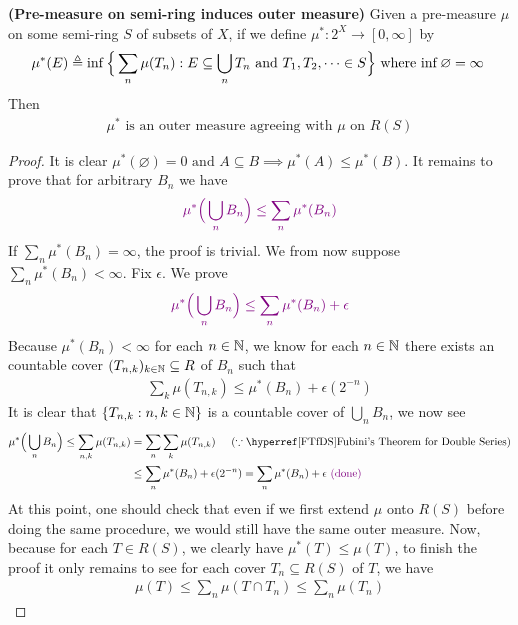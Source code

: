 \documentclass{report}
\begin{document}
\begin{theorem}
\label{Piom}
\textbf{(Pre-measure on semi-ring induces outer measure)} Given a pre-measure $\mu$ on some semi-ring $S$ of subsets of $X$, if we define $\mu^*:2^X\rightarrow [0,\infty]$ by
\begin{align*}
\mu^*(E)\triangleq \inf \Big\{ \sum_n \mu (T_n):E \subseteq \bigcup _n T_n\text{ and }T_1,T_2,\dots \in S \Big\}\text{ where $\inf \varnothing= \infty$ }
\end{align*}
Then 
\begin{align*}
  \mu^*\text{ is an outer measure agreeing with $\mu$ on $R(S)$}
\end{align*}
\end{theorem}
\begin{proof}
  It is clear $\mu^*(\varnothing)=0\text{ and }A\subseteq B \implies \mu^*(A)\leq \mu^*(B)$. It remains to prove that for arbitrary $B_n$ we have 
\begin{align*}
  \textcolor{violet}{\mu^* \Big(\bigcup_n B_n \Big)  \leq \sum_n \mu^* (B_n)}
\end{align*}
If  $\sum_n \mu^*(B_n)=\infty$, the proof is trivial. We from now suppose $\sum_n \mu^*(B_n)< \infty$. Fix $\epsilon $. We prove 
\begin{align*}
  \textcolor{violet}{\mu^*\Big(\bigcup _n B_n \Big)\leq \sum_n \mu^* (B_n)+\epsilon }
\end{align*}
Because $\mu^*(B_n)<\infty$ for each $n\in\mathbb{N}$, we know for each $n\in\mathbb{N}$ there exists an countable cover $(T_{n,k})_{k\in\mathbb{N}}\subseteq R$ of $B_n$ such that 
\begin{align*}
\sum_k \mu (T_{n,k}) \leq \mu^*(B_n)+\epsilon (2^{-n}) 
\end{align*}
It is clear that  $\{ T_{n,k}:n,k \in\mathbb{N} \}$ is a countable cover of $\bigcup_n B_n$, we now see 
\begin{align*}
  \mu^*\Big(\bigcup_n B_n \Big)\leq  \sum_{n,k} \mu (T_{n,k})&= \sum_n \sum_k \mu(T_{n,k})\hspace{0.5cm}(\because \text{\customref{FTfDS}{Fubini's Theorem for Double Series}})\\
&\leq \sum_n \mu^*(B_n)+ \epsilon (2^{-n})= \sum_n \mu^*(B_n)+ \epsilon \vdone
\end{align*}
At this point, one should check that even if we first extend $\mu$ onto $R(S)$ before doing the same procedure, we would still have the same outer measure. Now, because for each $T \in R(S)$, we clearly have $\mu^*(T)\leq \mu (T)$, to finish the proof it only remains to see for each cover $T_n \subseteq R(S)$ of $T$, we have
\begin{align*}
\mu (T)\leq \sum_n \mu (T\cap T_n)\leq \sum_n \mu (T_n)
\end{align*}
\end{proof}
\end{document}
